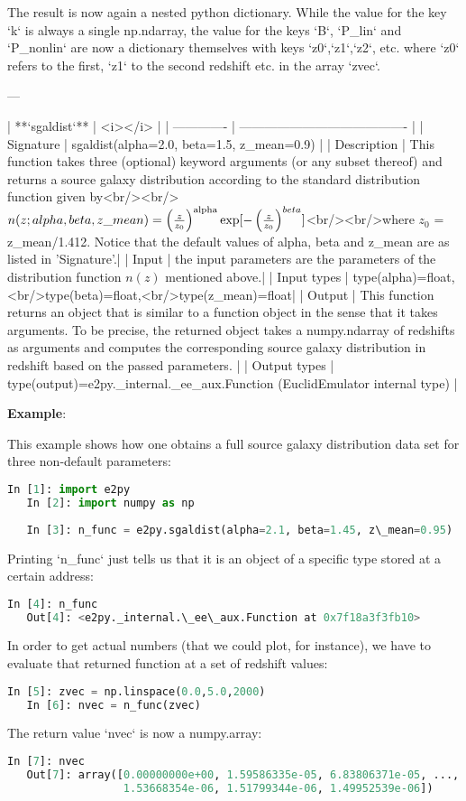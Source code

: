 \documentclass[american,11pt]{article}
\begin{document}
The result is now again a nested python dictionary. While the value for the key `k` is always a single np.ndarray, the value for the keys `B`, `P\_lin` and `P\_nonlin` are now a dictionary themselves with keys `z0`,`z1`,`z2`, etc. where `z0` refers to the first, `z1` to the second redshift etc. in the array `zvec`.

---

| **`sgaldist`** | <i></i> |
| ------------- | ---------------------------------------- |
| Signature | sgaldist(alpha=2.0, beta=1.5, z\_mean=0.9) |
| Description | This function takes three (optional) keyword arguments (or any subset thereof) and returns a source galaxy distribution according to the standard distribution function given by<br/><br/> $n(z; alpha, beta, z\_mean) = \left(\frac{z}{z_0}\right)^{\rm alpha} \exp[-\left(\frac{z}{z_0}\right)^{ beta}]$<br/><br/>where $z_0$ = z\_mean/1.412. Notice that the default values of alpha, beta and z\_mean are as listed in 'Signature'.|
| Input | the input parameters are the parameters of the distribution function $n(z)$ mentioned above.|
| Input types | type(alpha)=float,<br/>type(beta)=float,<br/>type(z\_mean)=float|
| Output | This function returns an object that is similar to a function object in the sense that it takes arguments. To be precise, the returned object takes a numpy.ndarray of redshifts as arguments and computes the corresponding source galaxy distribution in redshift based on the passed parameters.  |
| Output types | type(output)=e2py.\_internal.\_ee\_aux.Function (EuclidEmulator internal type) |

\textbf{Example}:

This example shows how one obtains a full source galaxy distribution data set for three non-default parameters:

\begin{lstlisting}[language=python]
   In [1]: import e2py
   In [2]: import numpy as np
 
   In [3]: n_func = e2py.sgaldist(alpha=2.1, beta=1.45, z\_mean=0.95)
\end{lstlisting}
Printing `n\_func` just tells us that it is an object of a specific type stored at a certain address:
\begin{lstlisting}[language=python]
   In [4]: n_func
   Out[4]: <e2py._internal.\_ee\_aux.Function at 0x7f18a3f3fb10>
\end{lstlisting}
In order to get actual numbers (that we could plot, for instance), we have to evaluate that returned function at a set of redshift values:
\begin{lstlisting}[language=python]
   In [5]: zvec = np.linspace(0.0,5.0,2000)
   In [6]: nvec = n_func(zvec)
\end{lstlisting}
The return value `nvec` is now a numpy.array:
\begin{lstlisting}[language=python]
   In [7]: nvec
   Out[7]: array([0.00000000e+00, 1.59586335e-05, 6.83806371e-05, ...,
                  1.53668354e-06, 1.51799344e-06, 1.49952539e-06])
\end{lstlisting}
\end{document}
